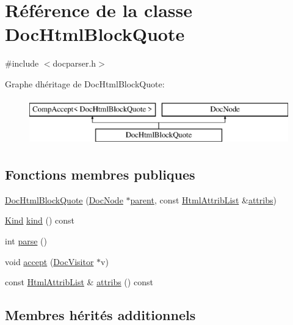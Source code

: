 \hypertarget{class_doc_html_block_quote}{}\section{Référence de la classe Doc\+Html\+Block\+Quote}
\label{class_doc_html_block_quote}


{\ttfamily \#include $<$docparser.\+h$>$}

Graphe d\textquotesingle{}héritage de Doc\+Html\+Block\+Quote\+:\begin{figure}[H]
\begin{center}
\leavevmode
\includegraphics[height=2.000000cm]{class_doc_html_block_quote}
\end{center}
\end{figure}
\subsection*{Fonctions membres publiques}
\begin{DoxyCompactItemize}
\item 
\hyperlink{class_doc_html_block_quote_a2c8b133bd1fed4e62d4cf90bb47ddb69}{Doc\+Html\+Block\+Quote} (\hyperlink{class_doc_node}{Doc\+Node} $\ast$\hyperlink{class_doc_node_a990d8b983962776a647e6231d38bd329}{parent}, const \hyperlink{class_html_attrib_list}{Html\+Attrib\+List} \&\hyperlink{class_doc_html_block_quote_ad69dde12edbec5a37f4097627cb1fadc}{attribs})
\item 
\hyperlink{class_doc_node_aebd16e89ca590d84cbd40543ea5faadb}{Kind} \hyperlink{class_doc_html_block_quote_a58326d3d9cc4b5e71b2f80ff7b14bb07}{kind} () const 
\item 
int \hyperlink{class_doc_html_block_quote_ac79bcb818ae3fc4802360b4913e4d3df}{parse} ()
\item 
void \hyperlink{class_doc_html_block_quote_a6abcc247f3496e6422a7421eed062d41}{accept} (\hyperlink{class_doc_visitor}{Doc\+Visitor} $\ast$v)
\item 
const \hyperlink{class_html_attrib_list}{Html\+Attrib\+List} \& \hyperlink{class_doc_html_block_quote_ad69dde12edbec5a37f4097627cb1fadc}{attribs} () const 
\end{DoxyCompactItemize}
\subsection*{Membres hérités additionnels}


